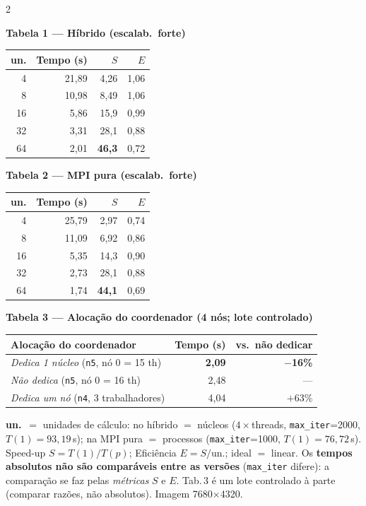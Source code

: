 \documentclass[10pt,a4paper]{article}
\begin{document}
\begin{multicols}{2}
\begin{center}
\textbf{Tabela 1 --- Híbrido (escalab.\ forte)}\\[3pt]
\begin{tabular}{r r r r}
\toprule
un. & Tempo (s) & $S$ & $E$ \\ \midrule
4  & 21,89 & 4,26 & 1,06 \\
8  & 10,98 & 8,49 & 1,06 \\
16 &  5,86 & 15,9 & 0,99 \\
32 &  3,31 & 28,1 & 0,88 \\
64 &  2,01 & \textbf{46,3} & 0,72 \\ \bottomrule
\end{tabular}

\vfill\columnbreak
\textbf{Tabela 2 --- MPI pura (escalab.\ forte)}\\[3pt]
\begin{tabular}{r r r r}
\toprule
un. & Tempo (s) & $S$ & $E$ \\ \midrule
4  & 25,79 & 2,97 & 0,74 \\
8  & 11,09 & 6,92 & 0,86 \\
16 &  5,35 & 14,3 & 0,90 \\
32 &  2,73 & 28,1 & 0,88 \\
64 &  1,74 & \textbf{44,1} & 0,69 \\ \bottomrule
\end{tabular}
\end{center}
\end{multicols}

\begin{center}
\textbf{Tabela 3 --- Alocação do coordenador (4 nós; lote controlado)}\\[3pt]
\begin{tabular}{lrr}
\toprule
Alocação do coordenador & Tempo (s) & vs.\ não dedicar \\ \midrule
\emph{Dedica 1 núcleo} (\texttt{n5}, nó 0 = 15 th) & \textbf{2,09} & \textbf{$-$16\%} \\
\emph{Não dedica} (\texttt{n5}, nó 0 = 16 th)      & 2,48          & --- \\
\emph{Dedica um nó} (\texttt{n4}, 3 trabalhadores) & 4,04          & $+$63\% \\ \bottomrule
\end{tabular}
\end{center}

{\small \textbf{un.}\ $=$ unidades de cálculo: no híbrido $=$ núcleos ($4\times$threads, \texttt{max\_iter}=2000, $T(1)=93{,}19$\,s); na MPI pura $=$ processos (\texttt{max\_iter}=1000, $T(1)=76{,}72$\,s). Speed-up $S=T(1)/T(p)$; Eficiência $E=S/$un.; ideal $=$ linear. Os \textbf{tempos absolutos não são comparáveis entre as versões} (\texttt{max\_iter} difere): a comparação se faz pelas \emph{métricas} $S$ e $E$. Tab.\,3 é um lote controlado à parte (comparar razões, não absolutos). Imagem 7680$\times$4320.}
\end{document}
